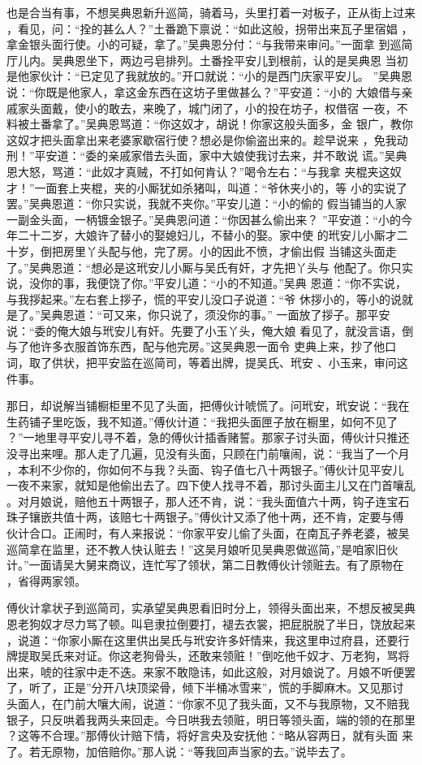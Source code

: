 也是合当有事，不想吴典恩新升巡简，骑着马，头里打着一对板子，正从街上过来
，看见，问：“拴的甚么人？”土番跪下禀说：“如此这般，拐带出来瓦子里宿娼
，拿金银头面行使。小的可疑，拿了。”吴典恩分付：“与我带来审问。”一面拿
到巡简厅儿内。吴典恩坐下，两边弓皂排列。土番拴平安儿到根前，认的是吴典恩
当初是他家伙计：“已定见了我就放的。”开口就说：“小的是西门庆家平安儿。
”吴典恩说：“你既是他家人，拿这金东西在这坊子里做甚么？”平安道：“小的
大娘借与亲戚家头面戴，使小的敢去，来晚了，城门闭了，小的投在坊子，权借宿
一夜，不料被土番拿了。”吴典恩骂道：“你这奴才，胡说！你家这般头面多，金
银广，教你这奴才把头面拿出来老婆家歇宿行使？想必是你偷盗出来的。趁早说来
，免我动刑！”平安道：“委的亲戚家借去头面，家中大娘使我讨去来，并不敢说
谎。”吴典恩大怒，骂道：“此奴才真贼，不打如何肯认？”喝令左右：“与我拿
夹棍夹这奴才！”一面套上夹棍，夹的小厮犹如杀猪叫，叫道：“爷休夹小的，等
小的实说了罢。”吴典恩道：“你只实说，我就不夹你。”平安儿道：“小的偷的
假当铺当的人家一副金头面，一柄镀金银子。”吴典恩问道：“你因甚么偷出来？
”平安道：“小的今年二十二岁，大娘许了替小的娶媳妇儿，不替小的娶。家中使
的玳安儿小厮才二十岁，倒把房里丫头配与他，完了房。小的因此不愤，才偷出假
当铺这头面走了。”吴典恩道：“想必是这玳安儿小厮与吴氏有奸，才先把丫头与
他配了。你只实说，没你的事，我便饶了你。”平安儿道：“小的不知道。”吴典
恩道：“你不实说，与我拶起来。”左右套上拶子，慌的平安儿没口子说道：“爷
休拶小的，等小的说就是了。”吴典恩道：“可又来，你只说了，须没你的事。”
一面放了拶子。那平安说：“委的俺大娘与玳安儿有奸。先要了小玉丫头，俺大娘
看见了，就没言语，倒与了他许多衣服首饰东西，配与他完房。”这吴典恩一面令
吏典上来，抄了他口词，取了供状，把平安监在巡简司，等着出牌，提吴氏、玳安
、小玉来，审问这件事。

那日，却说解当铺橱柜里不见了头面，把傅伙计唬慌了。问玳安，玳安说：“我在
生药铺子里吃饭，我不知道。”傅伙计道：“我把头面匣子放在橱里，如何不见了
？”一地里寻平安儿寻不着，急的傅伙计插香赌誓。那家子讨头面，傅伙计只推还
没寻出来哩。那人走了几遍，见没有头面，只顾在门前嚷闹，说：“我当了一个月
，本利不少你的，你如何不与我？头面、钩子值七八十两银子。”傅伙计见平安儿
一夜不来家，就知是他偷出去了。四下使人找寻不着，那讨头面主儿又在门首嚷乱
。对月娘说，赔他五十两银子，那人还不肯，说：“我头面值六十两，钩子连宝石
珠子镶嵌共值十两，该赔七十两银子。”傅伙计又添了他十两，还不肯，定要与傅
伙计合口。正闹时，有人来报说：“你家平安儿偷了头面，在南瓦子养老婆，被吴
巡简拿在监里，还不教人快认赃去！”这吴月娘听见吴典恩做巡简，”是咱家旧伙
计。”一面请吴大舅来商议，连忙写了领状，第二日教傅伙计领赃去。有了原物在
，省得两家领。

傅伙计拿状子到巡简司，实承望吴典恩看旧时分上，领得头面出来，不想反被吴典
恩老狗奴才尽力骂了顿。叫皂隶拉倒要打，褪去衣裳，把屁脱脱了半日，饶放起来
，说道：“你家小厮在这里供出吴氏与玳安许多奸情来，我这里申过府县，还要行
牌提取吴氏来对证。你这老狗骨头，还敢来领赃！”倒吃他千奴才、万老狗，骂将
出来，唬的往家中走不迭。来家不敢隐讳，如此这般，对月娘说了。月娘不听便罢
了，听了，正是”分开八块顶梁骨，倾下半桶冰雪来”，慌的手脚麻木。又见那讨
头面人，在门前大嚷大闹，说道：“你家不见了我头面，又不与我原物，又不赔我
银子，只反哄着我两头来回走。今日哄我去领赃，明日等领头面，端的领的在那里
？这等不合理。”那傅伙计赔下情，将好言央及安抚他：“略从容两日，就有头面
来了。若无原物，加倍赔你。”那人说：“等我回声当家的去。”说毕去了。

